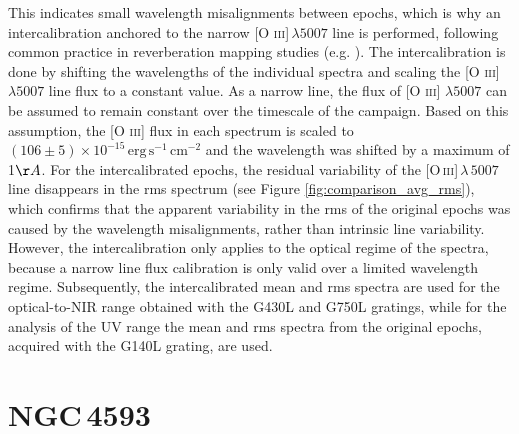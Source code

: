 This indicates small wavelength misalignments between epochs, which is why an intercalibration anchored to the narrow [O \textsc{iii}]\,$\lambda5007$ line is performed, following common practice in reverberation mapping studies (e.g. \cite{dietrich1994monitoring, denney2006ngc4593}). The intercalibration is done by shifting the wavelengths of the individual spectra and scaling the [O \textsc{iii}]\,$\lambda5007$ line flux to a constant value. As a narrow line, the flux of [O \textsc{iii}] $\lambda5007$ can be assumed to remain constant over the timescale of the campaign. Based on this assumption, the [O \textsc{iii}] flux in each spectrum is scaled to $(106 \pm 5)\times10^{-15}\,\mathrm{erg\,s^{-1}\,cm^{-2}}$ and the wavelength was shifted by a maximum of 1$\AA$. For the intercalibrated epochs, the residual variability of the [O\,\textsc{iii}]\,$\lambda\,5007$ line disappears in the rms spectrum (see Figure \ref{fig:comparison_avg_rms}), which confirms that the apparent variability in the rms of the original epochs was caused by the wavelength misalignments, rather than intrinsic line variability. However, the intercalibration only applies to the optical regime of the spectra, because a narrow line flux calibration is only valid over a limited wavelength regime. Subsequently, the intercalibrated mean and rms spectra are used for the optical-to-NIR range obtained with the G430L and G750L gratings, while for the analysis of the UV range the mean and rms spectra from the original epochs, acquired with the G140L grating, are used.



\section{NGC\,4593}
\label{NGC4593}

